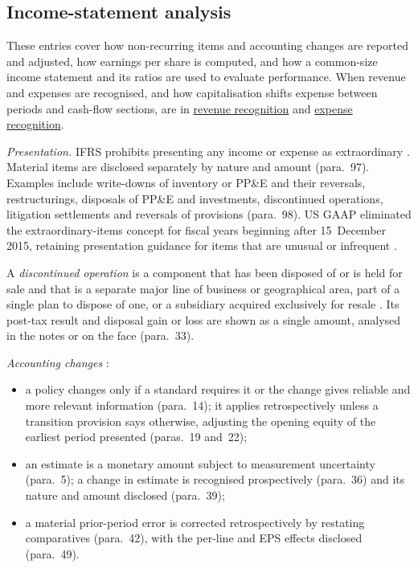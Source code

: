 \subsection{Income-statement analysis}

These entries cover how non-recurring items and accounting changes are reported and adjusted, how earnings per share is computed, and how a common-size income statement and its ratios are used to evaluate performance. When revenue and expenses are recognised, and how capitalisation shifts expense between periods and cash-flow sections, are in \hyperref[meth:revenue-recognition-analysis]{revenue recognition} and \hyperref[meth:expense-recognition-capitalisation]{expense recognition}.

\begin{qfmethod}\label{meth:non-recurring-items}
 \emph{Presentation.} IFRS prohibits presenting any income or expense as extraordinary \citep[IAS~1 para.~87]{eu-2023-1803-ias1}. Material items are disclosed separately by nature and amount (para.~97). Examples include write-downs of inventory or PP\&E and their reversals, restructurings, disposals of PP\&E and investments, discontinued operations, litigation settlements and reversals of provisions (para.~98). US GAAP eliminated the extraordinary-items concept for fiscal years beginning after 15~December 2015, retaining presentation guidance for items that are unusual or infrequent \citep[p.~2]{us-extraordinary-items-2015}.

A \emph{discontinued operation} is a component that has been disposed of or is held for sale and that is a separate major line of business or geographical area, part of a single plan to dispose of one, or a subsidiary acquired exclusively for resale \citep[IFRS~5 para.~32]{eu-2023-1803-ifrs5}. Its post-tax result and disposal gain or loss are shown as a single amount, analysed in the notes or on the face (para.~33).

\emph{Accounting changes} \citep[IAS~8]{eu-2023-1803-ias8}:
\begin{itemize}
\item a policy changes only if a standard requires it or the change gives reliable and more relevant information (para.~14); it applies retrospectively unless a transition provision says otherwise, adjusting the opening equity of the earliest period presented (paras.~19 and~22);
\item an estimate is a monetary amount subject to measurement uncertainty (para.~5); a change in estimate is recognised prospectively (para.~36) and its nature and amount disclosed (para.~39);
\item a material prior-period error is corrected retrospectively by restating comparatives (para.~42), with the per-line and EPS effects disclosed (para.~49).
\end{itemize}


\end{qfmethod}
